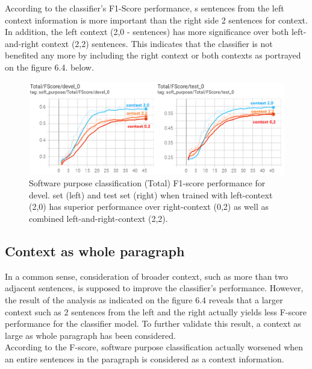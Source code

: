According to the classifier's F1-Score performance, s sentences from the left context information is more important than the right side 2 sentences for context. In addition, the left context (2,0 - sentences) has more significance over both left-and-right context (2,2) sentences. This indicates that the classifier is not benefited any more by including the right context or both contexts as portrayed on the figure 6.4. below. 

\begin{figure}[htbp]
	\centering
	\includegraphics[width=.86\textwidth]{4.graphics/figures/ch_6/2.left_context_vs_right/HD/left_both_right_hd}
	\caption{Software purpose classification (Total) F1-score performance for devel. set (left) and test set (right) when trained with left-context (2,0) has superior performance over right-context (0,2) as well as combined left-and-right-context (2,2).}
	\label{fig:chapter06:with}
\end{figure}


\subsection{Context as whole paragraph}
\label{sec:chapter06:paragraph}

In a common sense, consideration of broader context, such as more than two adjacent sentences, is supposed to improve the classifier’s performance. However, the result of the analysis as indicated on the figure 6.4 reveals that a larger context such as 2 sentences from the left and the right actually yields less F-score performance for the classifier model. To further validate this result, a context as large as whole paragraph has been considered. \\

According to the F-score, software purpose classification actually worsened when an entire sentences in the paragraph is considered as a context information. \\

